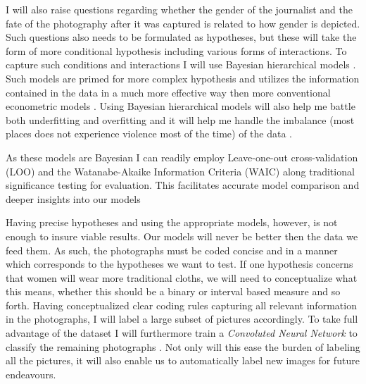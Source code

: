 \documentclass[a4paper]{article}
\begin{document}
I will also raise questions regarding whether the gender of the journalist and the fate of the photography after it was captured is related to how gender is depicted. Such questions also needs to be formulated as hypotheses, but these will take the form of more conditional hypothesis including various forms of interactions. To capture such conditions and interactions I will use Bayesian hierarchical models \citep{Gelman_2006, Gelman_2013, Mcelreath_2018}. Such models are primed for more complex hypothesis and utilizes the information contained in the data in a much more effective way then more conventional econometric models \cite[355]{Mcelreath_2018}. Using Bayesian hierarchical models will also help me battle both underfitting and overfitting and it will help me handle the imbalance (most places does not experience violence most of the time) of the data \cite[356-357]{Mcelreath_2018}. \par

As these models are Bayesian I can readily employ Leave-one-out cross-validation (LOO) and the Watanabe-Akaike Information Criteria (WAIC) along traditional significance testing for evaluation. This facilitates accurate model comparison and deeper insights into our models \cite[165-205]{Mcelreath_2018} \par

Having precise hypotheses and using the appropriate models, however, is not enough to insure viable results. Our models will never be better then the data we feed them. As such, the photographs must be coded concise and in a manner which corresponds to the hypotheses we want to test. If one hypothesis concerns that women will wear more traditional cloths, we will need to conceptualize what this means, whether this should be a binary or interval based measure and so forth. Having conceptualized clear coding rules capturing all relevant information in the photographs, I will label a large subset of pictures accordingly. To take full advantage of the dataset I will furthermore train a \emph{Convoluted Neural Network} to classify the remaining photographs \citep[120-122]{francois2017deep}. Not only will this ease the burden of labeling all the pictures, it will also enable us to automatically label new images for future endeavours.\par    
\end{document}

